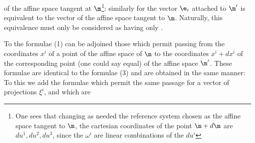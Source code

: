 of the affine space tangent at $\m$\footnote{One sees that changing as needed the reference system chosen as the affine space tangent to $\m$, the cartesian coordinates of the point $\m + d\m$ are $du^1, du^2, du^3$, since the $\omega^i$ are linear combinations of the $du^i$}: similarly for the vector $\e_i$ attached to $\m'$ is equivalent to the vector
of the affine space tangent to $\m$. Naturally, this equivalence must only be considered as having only .

To the formulae (1) can be adjoined those which permit passing from the coordinates $x^i$ of a point of the affine space of $\m$ to the coordinates $x^i + dx^i$ of the corresponding point (one could say equal) of the affine space $\m'$. These formulae are identical to the formulae (3) and are obtained in the same manner:
To this we add the formulae which permit the same passage for a vector of projections $\xi^i$, and which are
% 